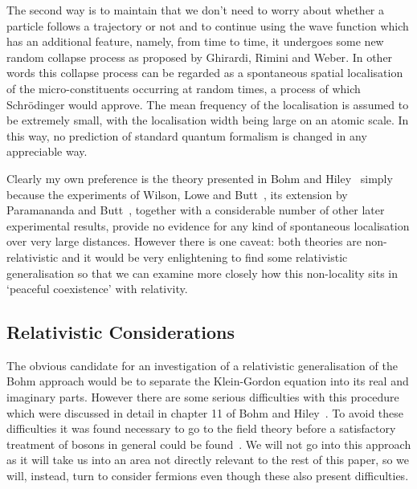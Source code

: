 \documentclass[11pt]{article}
\begin{document}
 The second way is to maintain that we don't need to worry about whether a particle follows a trajectory or not and to continue using the wave function which has an additional feature, namely, from time to time, it undergoes some new random collapse process as proposed by Ghirardi, Rimini and Weber\cite{grw86}.
In other words this collapse process can be regarded as a spontaneous spatial localisation of the micro-constituents occurring at random times, a process of which Schr\"{o}dinger would approve. The mean frequency of the localisation is assumed to be extremely small, with the localisation width being large on an atomic scale. In this way, no prediction of standard quantum formalism is changed in any appreciable way.

Clearly my own preference is the theory presented in Bohm and Hiley~\cite{dbbh93} simply because the experiments of Wilson, Lowe and Butt~\cite{awjldb67}, its extension by Paramananda and Butt~\cite{vpdb87}, together with a considerable number of other later experimental results, provide no evidence for any kind of spontaneous localisation over very large distances.  However there is one caveat: both theories are non-relativistic and it would be very enlightening to find some relativistic generalisation so that we can examine more closely how this non-locality sits in `peaceful coexistence' with relativity.

\subsection{Relativistic Considerations}

The obvious candidate for an investigation of a relativistic generalisation of the Bohm approach would be to separate the Klein-Gordon equation into its real and imaginary parts. However there are some serious difficulties  with this procedure which were discussed in detail in chapter 11 of Bohm and Hiley~\cite{dbbh93}.  To avoid these difficulties it was found necessary to go to the field theory before a satisfactory treatment of bosons in general could be found~\cite{dbbhpk87, pk94}. 
We will not go into this approach as it will take us into an area not directly relevant to the rest of this paper, so we will, instead, turn to consider fermions even though these also  present difficulties. 
\end{document}

